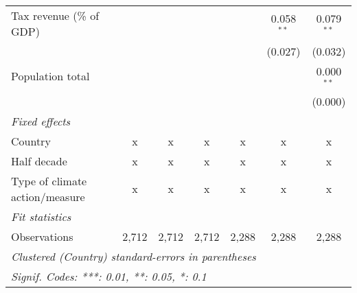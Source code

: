 \begin{tabular}{lcccccc}
   Tax revenue (\% of GDP)                                      &              &                &                &               & 0.058$^{**}$  & 0.079$^{**}$\\   
                                                                &              &                &                &               & (0.027)       & (0.032)\\   
   Population total                                             &              &                &                &               &               & 0.000$^{**}$\\   
                                                                &              &                &                &               &               & (0.000)\\   
   \emph{Fixed effects}\\
   Country                                                      & x            & x              & x              & x             & x             & x\\  
   Half decade                                                  & x            & x              & x              & x             & x             & x\\  
   Type of climate action/measure                               & x            & x              & x              & x             & x             & x\\  
   \midrule \emph{Fit statistics}\\
   Observations                                                 & 2,712        & 2,712          & 2,712          & 2,288         & 2,288         & 2,288\\  
   \midrule
   \multicolumn{7}{l}{\emph{Clustered (Country) standard-errors in parentheses}}\\
   \multicolumn{7}{l}{\emph{Signif. Codes: ***: 0.01, **: 0.05, *: 0.1}}\\
\end{tabular}
\par\endgroup


